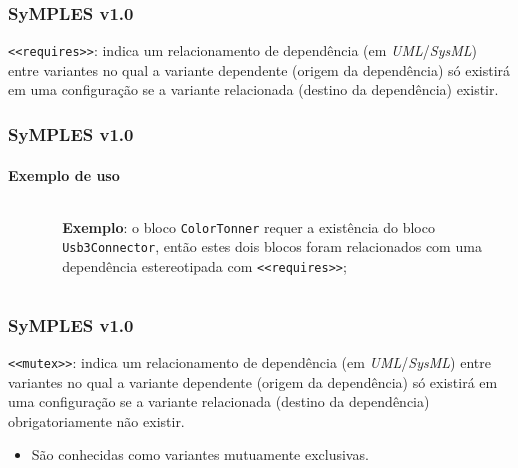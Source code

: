 \begin{frame}
\frametitle{SyMPLES v1.0}

  \texttt{<<requires>>}: indica um relacionamento de dependência (em \textit{UML}/\textit{SysML}) entre variantes no qual a
variante dependente (origem da dependência) só existirá em uma configuração se a variante relacionada (destino da dependência) existir.

\end{frame}


\begin{frame}
\frametitle{SyMPLES v1.0}
\framesubtitle{Exemplo de uso}
  
  \begin{columns}[onlytextwidth]
  
    \begin{column}{0.4\textwidth}
      \begin{figure}
      \end{figure}
    \end{column}
    
    \begin{column}{0.6\textwidth}
      \textbf{Exemplo}: o bloco \texttt{ColorTonner} requer a existência do bloco \texttt{Usb3Connector}, então estes dois blocos foram relacionados com uma dependência estereotipada com \texttt{<<requires>>};
    \end{column}
    
  \end{columns}

\end{frame}


\begin{frame}
\frametitle{SyMPLES v1.0}

  \texttt{<<mutex>>}: indica um relacionamento de dependência (em \textit{UML}/\textit{SysML}) entre variantes no qual a variante dependente (origem da dependência) só existirá em uma configuração se a variante relacionada (destino da dependência) obrigatoriamente não existir.

  \begin{itemize}
    \item {
      São conhecidas como variantes mutuamente exclusivas.
    }
  \end{itemize}

\end{frame}



